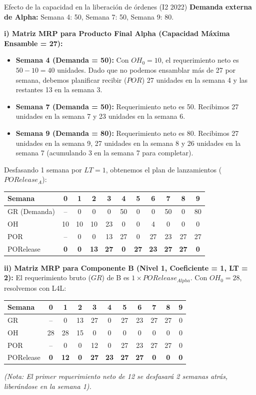 \begin{ejercicio}{Efecto de la capacidad en la liberación de órdenes (I2 2022)}
\textbf{Demanda externa de Alpha:} Semana 4: 50, Semana 7: 50, Semana 9: 80.

\textbf{i) Matriz MRP para Producto Final Alpha (Capacidad Máxima Ensamble = 27):}
\begin{itemize}[leftmargin=1.4em, itemsep=2pt]
  \item \textbf{Semana 4 (Demanda = 50):} Con $OH_0=10$, el requerimiento neto es $50-10 = 40$ unidades. Dado que no podemos ensamblar más de 27 por semana, debemos planificar recibir ($POR$) 27 unidades en la semana 4 y las restantes 13 en la semana 3.
  \item \textbf{Semana 7 (Demanda = 50):} Requerimiento neto es 50. Recibimos 27 unidades en la semana 7 y 23 unidades en la semana 6.
  \item \textbf{Semana 9 (Demanda = 80):} Requerimiento neto es 80. Recibimos 27 unidades en la semana 9, 27 unidades en la semana 8 y 26 unidades en la semana 7 (acumulando 3 en la semana 7 para completar).
\end{itemize}
Desfasando 1 semana por $LT=1$, obtenemos el plan de lanzamientos ($PORelease_A$):
\begin{center}\small
\begin{tabular}{@{}lcccccccccc@{}}
  \toprule
  Semana & 0 & 1 & 2 & 3 & 4 & 5 & 6 & 7 & 8 & 9 \\
  \midrule
  GR (Demanda) & -- & 0 & 0 & 0 & 50 & 0 & 0 & 50 & 0 & 80 \\
  OH           & 10 & 10 & 10 & 23 & 0 & 0 & 4 & 0 & 0 & 0 \\
  POR          & -- & 0 & 0 & 13 & 27 & 0 & 27 & 23 & 27 & 27 \\
  PORelease    & \textbf{0} & \textbf{0} & \textbf{13} & \textbf{27} & \textbf{0} & \textbf{27} & \textbf{23} & \textbf{27} & \textbf{27} & \textbf{0} \\
  \bottomrule
\end{tabular}
\end{center}

\textbf{ii) Matriz MRP para Componente B (Nivel 1, Coeficiente = 1, LT = 2):}
El requerimiento bruto ($GR$) de B es $1 \times PORelease_{Alpha}$. Con $OH_0=28$, resolvemos con L4L:
\begin{center}\small
\begin{tabular}{@{}lcccccccccc@{}}
  \toprule
  Semana & 0 & 1 & 2 & 3 & 4 & 5 & 6 & 7 & 8 & 9 \\
  \midrule
  GR           & -- & 0 & 13 & 27 & 0 & 27 & 23 & 27 & 27 & 0 \\
  OH           & 28 & 28 & 15 & 0 & 0 & 0 & 0 & 0 & 0 & 0 \\
  POR          & -- & 0 & 0 & 12 & 0 & 27 & 23 & 27 & 27 & 0 \\
  PORelease    & \textbf{0} & \textbf{12} & \textbf{0} & \textbf{27} & \textbf{23} & \textbf{27} & \textbf{27} & \textbf{0} & \textbf{0} & \textbf{0} \\
  \bottomrule
\end{tabular}
\end{center}
\textit{(Nota: El primer requerimiento neto de 12 se desfasará 2 semanas atrás, liberándose en la semana 1).}


\end{ejercicio}
